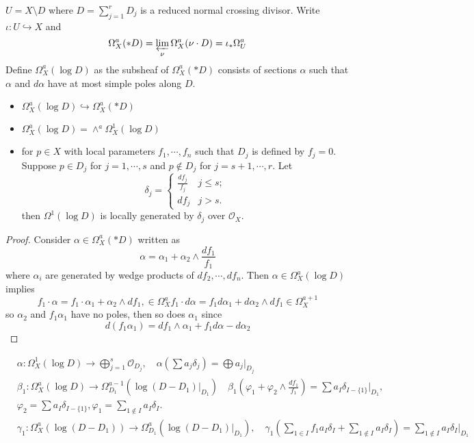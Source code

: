 \documentclass[leqno]{amsart}
\newcommand{\1}{\mathbf{1}}
\theoremstyle{definition}
\theoremstyle{remark}
\begin{document}
$U=X\setminus D$ where
$D=\sum_{j=1}^rD_j$ is a reduced normal crossing divisor.
Write $\iota\colon U\hookrightarrow X$ and
\[
	 \Omega_X^a(*D)=\varprojlim_\nu \Omega_X^a(\nu\cdot D)
	 =\iota_*\Omega_U^a
\]
Define $\Omega_X^a(\log D)$ as the subsheaf of $\Omega_X^a(*D)$
consists of sections  $\alpha$ such that 
$\alpha$ and  $d\alpha$ have at most simple poles along  $D$.
\begin{itemize}
	\item $\Omega_X^a(\log D)\hookrightarrow \Omega_X^a(*D)$
	\item  $\Omega_X^a(\log D)=\wedge^a \Omega_X^1(\log D)$
	\item for  $p\in X$ with local parameters
		 $f_1,\cdots,f_n$ such that 
		 $D_j$ is defined by  $f_j=0$.
		 Suppose  $p\in D_j$ for  $j=1,\cdots,s$ and 
		 $p\notin D_j$ for  $j=s+1,\cdots,r$.
		 Let
		 \[
		 	\delta_j=
			\begin{cases}
				\frac{df_j}{f_j} & j\leq s;\\
				df_j & j>s.
			\end{cases}
		 \]
		 then $\Omega^1(\log D)$
		 is locally generated by $\delta_j$
		 over  $\mathcal{O}_X$.
\end{itemize}
\begin{proof}
	Consider $\alpha\in \Omega_X^a(*D)$ written as
	 \[
		\alpha=\alpha_1+\alpha_2\wedge\frac{df_1}{f_1}
	\]
	where $\alpha_i$ are generated by wedge products
	of  $df_2,\cdots,df_n$. 
	Then $\alpha\in \Omega_X^a(\log D)$ implies
	 \[
	f_1\cdot \alpha=f_1\cdot\alpha_1+\alpha_2\wedge df_1,
	\in \Omega_X^a
	f_1\cdot d\alpha=f_1d\alpha_1+d\alpha_2\wedge df_1
	\in \Omega_X^{a+1}
	\]
	so $\alpha_2$ and  $f_1\alpha_1$ have no poles,
	then so does $\alpha_1$ since
	 \[
		 d(f_1\alpha_1)=
		 df_1\wedge\alpha_1+f_1d\alpha-d\alpha_2
	\]
\end{proof}

\begin{align}
	&\alpha\colon \Omega_X^1(\log D)\to
	\bigoplus_{j=1}^s\mathcal{O}_{D_j},\quad
	\alpha(\sum a_j\delta_j)=\bigoplus a_j\vert_{D_j}\\
	&\beta_1\colon \Omega_X^a(\log D)\to 
	\Omega_{D_1}^{a-1}(\log(D-D_1)\vert_{D_1})\quad
	\beta_1(\varphi_1+\varphi_2\wedge\frac{df_1}{f_1})
	=\sum a_I\delta_{I-\{1\}}\vert_{D_1},\\
	&\varphi_2=\sum a_I\delta_{I-\{1\}},
	\varphi_1=\sum_{1\notin I} a_I\delta_I.\\
	&\gamma_1\colon 
	\Omega_X^a(\log(D-D_1))\to 
	\Omega_{D_1}^a(\log(D-D_1)\vert_{D_1}),\quad
	\gamma_1(\sum_{1\in I}f_1a_I\delta_I+
	\sum_{1\notin I}a_I\delta_I)=
	\sum_{1\notin I}a_I\delta_I\vert_{D_1}
\end{align}
\end{document}
